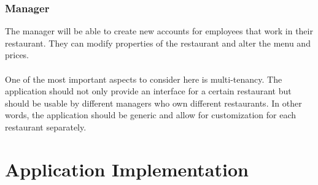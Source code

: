 \documentclass[12pt]{article}
\begin{document}
\begin{multicols}{2}
\subsubsection{Manager}
The manager will be able to create new accounts for employees that work in their restaurant. They can modify properties of the restaurant and alter the menu and prices. 
\\\\
One of the most important aspects to consider here is multi-tenancy. The application should not only provide an interface for a certain restaurant but should be usable by different managers who own different restaurants. In other words, the application should be generic and allow for customization for each restaurant separately.




\end{multicols}
\section{Application Implementation}\label{sec:implementation}
\end{document}

